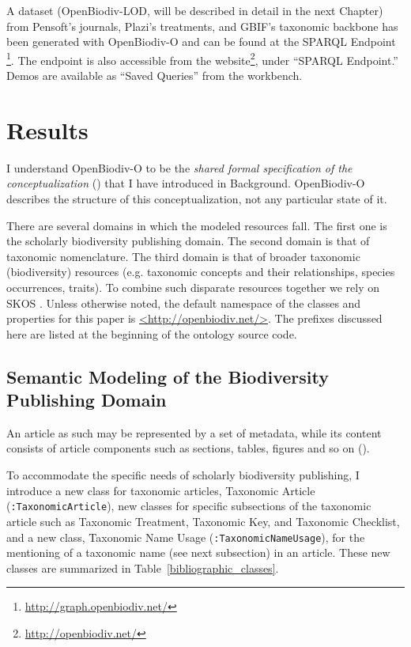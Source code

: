A dataset (OpenBiodiv-LOD, will be described in detail in the next Chapter) from Pensoft's journals, Plazi's treatments, and GBIF's taxonomic backbone has been generated with \mbox{OpenBiodiv-O} and can be found at the SPARQL Endpoint \footnote{\href{http://graph.openbiodiv.net/}{http://graph.openbiodiv.net/}}. The endpoint is also accessible from the website\footnote{\href{http://openbiodiv.net/}{http://openbiodiv.net/}}, under ``SPARQL Endpoint.'' Demos are available as ``Saved Queries'' from the workbench.

\section{Results}

I understand OpenBiodiv-O to be the \emph{shared formal specification of the conceptualization} (\cite{gruber_translation_1993,obitko_translations_2007,staab_handbook_2009}) that I have introduced in Background. OpenBiodiv-O describes the structure of this conceptualization, not any particular state of it.

There are several domains in which the modeled resources fall. The first one is the scholarly biodiversity publishing domain. The second domain is that of taxonomic nomenclature. The third domain is that of broader taxonomic (biodiversity) resources (e.g. taxonomic concepts and their relationships, species occurrences, traits). To combine such disparate resources together we rely on SKOS \cite{miles_skos_nodate}. Unless otherwise noted, the default namespace of the classes and properties for this paper is \url{<http://openbiodiv.net/>}. The prefixes discussed here are listed at the beginning of the ontology source code.

\subsection{Semantic Modeling of the Biodiversity Publishing Domain}

An article as such may be represented by a set of metadata, while its content consists of article components such as sections, tables, figures and so on (\cite{peroni_example_2015}).

To accommodate the specific needs of scholarly biodiversity publishing, I introduce a new class for taxonomic articles, Taxonomic Article ({\tt :TaxonomicArticle}), new classes for specific subsections of the taxonomic
article such as Taxonomic Treatment, Taxonomic Key, and Taxonomic Checklist, and a new class, Taxonomic Name Usage ({\tt :TaxonomicNameUsage}), for the mentioning of a taxonomic name (see next subsection) in an article. These new classes are summarized in Table~\ref{bibliographic_classes}.

